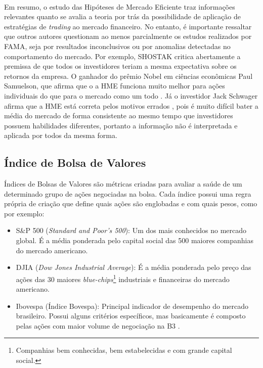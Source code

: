 \paragraph{} Em resumo, o estudo das Hipóteses de Mercado Eficiente traz informações relevantes quanto se avalia a teoria por trás da possibilidade de aplicação de estratégias de \textit{trading} ao mercado financeiro. No entanto, é importante ressaltar que outros autores questionam ao menos parcialmente os estudos realizados por FAMA, seja por resultados inconclusivos ou por anomalias detectadas no comportamento do mercado. Por exemplo, SHOSTAK \cite{shostak1997defense} critica abertamente a premissa de que todos os investidores teriam a mesma expectativa sobre os retornos da empresa. O ganhador do prêmio Nobel em ciências econômicas Paul Samuelson, que afirma que o a HME funciona muito melhor para ações individuais do que para o mercado como um todo \cite{jung2005samuelson}. Já o investidor Jack Schwager afirma que a HME está correta pelos motivos errados \cite{schwager2012market}, pois é muito difícil bater a média do mercado de forma consistente ao mesmo tempo que investidores possuem habilidades diferentes, portanto a informação não é interpretada e aplicada por todos da mesma forma.



\subsection{Índice de Bolsa de Valores}
\label{sub:ibov}

Índices de Bolsas de Valores \cite{stock_index} são métricas criadas para avaliar a saúde de um determinado grupo de ações negociadas na bolsa. Cada índice possui uma regra própria de criação que define quais ações são englobadas e com quais pesos, como por exemplo:

\begin{itemize}
    \item S\&P 500 (\textit{Standard and Poor's 500}): Um dos mais conhecidos no mercado global. É a média ponderada pelo capital social das 500 maiores companhias do mercado americano.
    \item DJIA (\textit{Dow Jones Industrial Average}): É a média ponderada pelo preço das ações das 30 maiores \textit{blue-chips}\footnote{Companhias bem conhecidas, bem estabelecidas e com grande capital social.} industriais e financeiras do mercado americano.
    \item Ibovespa (Índice Bovespa): Principal indicador de desempenho do mercado brasileiro. Possui alguns critérios específicos, mas basicamente é composto pelas ações com maior volume de negociação na B3 \cite{ibovespa}.
\end{itemize}

